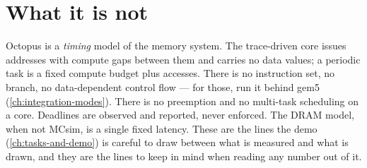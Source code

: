 \section{What it is not}

Octopus is a \emph{timing} model of the memory system. The trace-driven core issues addresses
with compute gaps between them and carries no data values; a periodic task is a fixed compute
budget plus accesses. There is no instruction set, no branch, no data-dependent control flow
--- for those, run it behind gem5 (\cref{ch:integration-modes}). There is no preemption and no
multi-task scheduling on a core. Deadlines are observed and reported, never enforced. The DRAM
model, when not MCsim, is a single fixed latency. These are the lines the demo
(\cref{ch:tasks-and-demo}) is careful to draw between what is measured and what is drawn, and
they are the lines to keep in mind when reading any number out of it.
